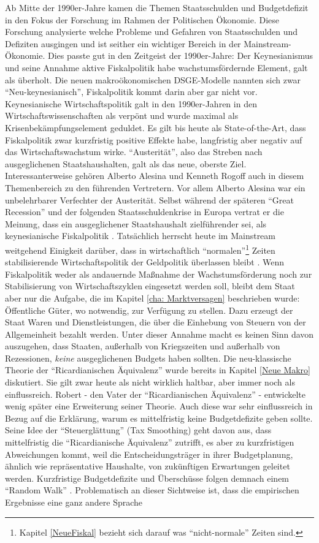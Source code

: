 Ab Mitte der 1990er-Jahre kamen die Themen Staatsschulden und Budgetdefizit in den Fokus der Forschung im Rahmen der Politischen Ökonomie. Diese Forschung analysierte welche Probleme und Gefahren von Staatsschulden und Defiziten ausgingen und ist seither ein wichtiger Bereich in der Mainstream-Ökonomie. Dies passte gut in den Zeitgeist der 1990er-Jahre: Der Keynesianismus und seine Annahme aktive Fiskalpolitik habe wachstumsfördernde Element, galt als überholt. Die neuen makroökonomischen DSGE-Modelle nannten sich zwar "`Neu-keynesianisch"', Fiskalpolitik kommt darin aber gar nicht vor. Keynesianische Wirtschaftspolitik galt in den 1990er-Jahren in den Wirtschaftswissenschaften als verpönt und wurde maximal als Krisenbekämpfungselement geduldet. Es gilt bis heute als State-of-the-Art, dass Fiskalpolitik zwar kurzfristig positive Effekte habe, langfristig aber negativ auf das Wirtschaftswachstum wirke. "`Austerität"', also das Streben nach ausgeglichenen Staatshaushalten, galt als das neue, oberste Ziel. Interessanterweise gehören Alberto Alesina und Kenneth Rogoff auch in diesem Themenbereich zu den führenden Vertretern. Vor allem Alberto Alesina war ein unbelehrbarer Verfechter der Austerität. Selbst während der späteren "`Great Recession"' und der folgenden Staatsschuldenkrise in Europa vertrat er die Meinung, dass ein ausgeglichener Staatshaushalt zielführender sei, als keynesianische Fiskalpolitik \parencite{Alesina2019}. Tatsächlich herrscht heute im Mainstream weitgehend Einigkeit darüber, dass in wirtschaftlich "`normalen"'\footnote{Kapitel \ref{NeueFiskal} bezieht sich darauf was "`nicht-normale"' Zeiten sind.} Zeiten stabilisierende Wirtschaftspolitik der Geldpolitik überlassen bleibt \textcite[S. 660]{Romer2019}. Wenn Fiskalpolitik weder als andauernde Maßnahme der Wachstumsförderung noch zur Stabilisierung von Wirtschaftszyklen eingesetzt werden soll, bleibt dem Staat aber nur die Aufgabe, die im Kapitel \ref{cha: Marktversagen} beschrieben wurde: Öffentliche Güter, wo notwendig, zur Verfügung zu stellen. Dazu erzeugt der Staat Waren und Dienstleistungen, die über die Einhebung von Steuern von der Allgemeinheit bezahlt werden. Unter dieser Annahme macht es keinen Sinn davon auszugehen, dass Staaten, außerhalb von Kriegszeiten und außerhalb von Rezessionen, \textit{keine} ausgeglichenen Budgets haben sollten. Die neu-klassische Theorie der "`Ricardianischen Äquivalenz"' wurde bereits in Kapitel \ref{Neue Makro} diskutiert. Sie gilt zwar heute als nicht wirklich haltbar, aber immer noch als einflussreich. Robert \textcite{Barro1979} - den Vater der "`Ricardianischen Äquivalenz"' - entwickelte wenig später eine Erweiterung seiner Theorie. Auch diese war sehr einflussreich in Bezug auf die Erklärung, warum es mittelfristig keine Budgetdefizite geben sollte. Seine Idee der "`Steuerglättung"' (Tax Smoothing) geht davon aus, dass mittelfristig die "`Ricardianische Äquivalenz"' zutrifft, es aber zu kurzfristigen Abweichungen kommt, weil die Entscheidungsträger in ihrer Budgetplanung, ähnlich wie repräsentative Haushalte, von zukünftigen Erwartungen geleitet werden. Kurzfristige Budgetdefizite und Überschüsse folgen demnach einem "`Random Walk"' \parencite[S. 676]{Romer2019}. Problematisch an dieser Sichtweise ist, dass die empirischen Ergebnisse eine ganz andere Sprache 